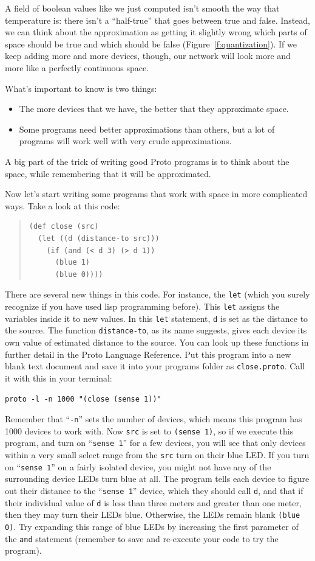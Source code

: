 \documentclass{article}
\newcommand\code[1]{\begin{center}\var{#1}\end{center}}
\newcommand\var[1]{{\tt #1}}
\newcommand\qvar[1]{``{\tt #1}''}
\begin{document}
A field of boolean values like we just computed isn't smooth the way
that temperature is: there isn't a ``half-true'' that goes between
true and false.  Instead, we can think about the approximation as
getting it slightly wrong which parts of space should be true and
which should be false (Figure~\ref{f:quantization}).  If we keep
adding more and more devices, though, our network will look more and
more like a perfectly continuous space.

What's important to know is two things:
\begin{itemize}
\item The more devices that we have, the better that they approximate
  space.
\item Some programs need better approximations than others, but a lot
  of programs will work well with very crude approximations.
\end{itemize}
A big part of the trick of writing good Proto programs is to think
about the space, while remembering that it will be approximated.

Now let's start writing some programs that work with space in more
complicated ways.  Take a look at this code:

\begin{quote}
\begin{verbatim}
(def close (src) 
  (let ((d (distance-to src)))
    (if (and (< d 3) (> d 1)) 
      (blue 1) 
      (blue 0))))
\end{verbatim}
\end{quote}

There are several new things in this code. For instance, the \var{let}
(which you surely recognize if you have used lisp programming before).
This \var{let} assigns the variables inside it to new values.  In this
\var{let} statement, \var{d} is set as the distance to the source.
The function \var{distance-to}, as its name suggests, gives each
device its own value of estimated distance to the source.  You can
look up these functions in further detail in the Proto Language
Reference.  Put this program into a new blank text document and save
it into your programs folder as \var{close.proto}. Call it with this
in your terminal:

\code{proto -l -n 1000 "(close (sense 1))"}

Remember that \qvar{-n} sets the number of devices, which means this
program has 1000 devices to work with. Now \var{src} is set to
\var{(sense 1)}, so if we execute this program, and turn on
\qvar{sense 1} for a few devices, you will see that only devices
within a very small select range from the \var{src} turn on their blue
LED.  If you turn on \qvar{sense 1} on a fairly isolated device, you
might not have any of the surrounding device LEDs turn blue at all.
The program tells each device to figure out their distance to the
\qvar{sense 1} device, which they should call \var{d}, and that if
their individual value of \var{d} is less than three meters and
greater than one meter, then they may turn their LEDs blue.
Otherwise, the LEDs remain blank \var{(blue 0)}.  Try expanding this
range of blue LEDs by increasing the first parameter of the \var{and}
statement (remember to save and re-execute your code to try the
program).
\end{document}
